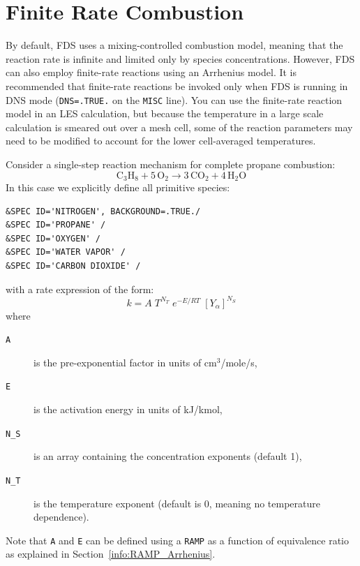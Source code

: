 \documentclass[11pt]{book}
\newcommand{\ct}{\tt\small}
\begin{document}
\clearpage

\section{Finite Rate Combustion}
\label{info:finite}

By default, FDS uses a mixing-controlled combustion model, meaning that the reaction rate is infinite and limited only by species concentrations. However, FDS can also employ finite-rate reactions using an Arrhenius model. It is recommended that finite-rate reactions be invoked only
when FDS is running in DNS mode ({\ct DNS=.TRUE.} on the {\ct MISC} line).
You can use the finite-rate reaction model in an
LES calculation, but because the temperature in a large scale calculation
is smeared out over a mesh cell, some of the reaction parameters may need
to be modified to account for the lower cell-averaged temperatures.

Consider a single-step reaction mechanism for complete propane combustion:
\begin{equation}\label{eq:propane_1step}
\mathrm{C_3H_8 + 5\,O_{2} \rightarrow 3\,CO_{2} + 4\,H_{2}O}
\end{equation}
In this case we explicitly define all primitive species:

\footnotesize
\begin{verbatim}
&SPEC ID='NITROGEN', BACKGROUND=.TRUE./
&SPEC ID='PROPANE' /
&SPEC ID='OXYGEN' /
&SPEC ID='WATER VAPOR' /
&SPEC ID='CARBON DIOXIDE' /
\end{verbatim} \normalsize

\noindent with a rate expression of the form:
\begin{equation}\label{eq:reac_rate}
k = A \; T^{N_{T}} \; e^{-E/RT} \; [Y_{\alpha}]^{N_S}
\end{equation}
where
\begin{description}
\item[{\ct A}] is the pre-exponential factor in units of cm$^3$/mole/s,
\item[{\ct E}] is the activation energy in units of kJ/kmol,
\item[{\ct N\_S}] is an array containing the concentration exponents (default 1),
\item[{\ct N\_T}] is the temperature exponent (default is 0, meaning no temperature dependence).
\end{description}
Note that {\ct A} and {\ct E} can be defined using a {\ct RAMP} as a function of equivalence ratio as explained in Section~\ref{info:RAMP_Arrhenius}.
\end{document}
